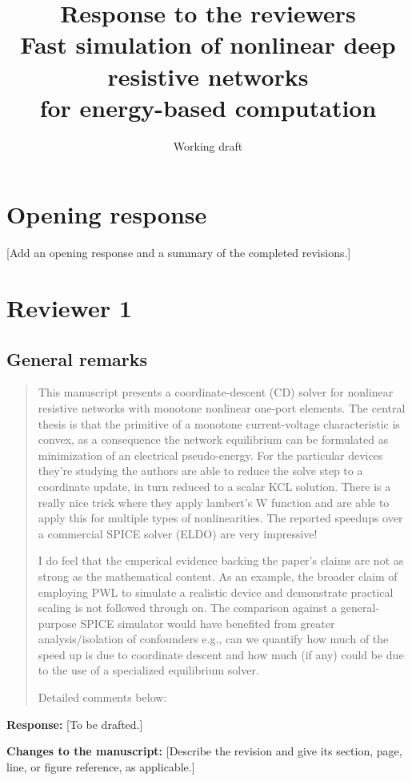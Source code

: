 \documentclass[11pt,a4paper]{article}
\title{Response to the reviewers\\[0.5em]
\large Fast simulation of nonlinear deep resistive networks\\
for energy-based computation}
\author{}
\date{Working draft}
\newenvironment{reviewercomment}
  {\begin{quote}\small\color{reviewerblue}}
  {\end{quote}}
\newcommand{\placeholder}[1]{[#1]}
\begin{document}
\maketitle

\section*{Opening response}
\placeholder{Add an opening response and a summary of the completed revisions.}

\section*{Reviewer 1}
\subsection*{General remarks}
\begin{reviewercomment}
This manuscript presents a coordinate-descent (CD) solver for nonlinear
resistive networks with monotone nonlinear one-port elements. The central
thesis is that the primitive of a monotone current-voltage characteristic
is convex, as a consequence the network equilibrium can be formulated as
minimization of an electrical pseudo-energy. For the particular devices
they're studying the authors are able to reduce the solve step to a
coordinate update, in turn reduced to a scalar KCL solution. There is a
really nice trick where they apply lambert's W function and are able to
apply this for multiple types of nonlinearities. The reported speedups
over a commercial SPICE solver (ELDO) are very impressive!

I do feel that the emperical evidence backing the paper's claims are not
as strong as the mathematical content. As an example, the broader claim
of employing PWL to simulate a realistic device and demonstrate practical
scaling is not followed through on. The comparison against a
general-purpose SPICE simulator would have benefited from greater
analysis/isolation of confounders e.g., can we quantify how much of the
speed up is due to coordinate descent and how much (if any) could be due
to the use of a specialized equilibrium solver.

Detailed comments below:
\end{reviewercomment}

\noindent\textbf{Response:}
\placeholder{To be drafted.}

\noindent\textbf{Changes to the manuscript:}
\placeholder{Describe the revision and give its section, page, line, or figure reference, as applicable.}
\end{document}
